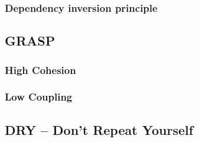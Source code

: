 \documentclass[12pt,a4paper,titlepage,ngerman,pdftex]{report}
\begin{document}
    \subsubsection{Dependency inversion principle}

    \subsection{GRASP}

    \subsubsection{High Cohesion}

    \subsubsection{Low Coupling}
    
    \subsection{DRY -- Don't Repeat Yourself}
\end{document}
